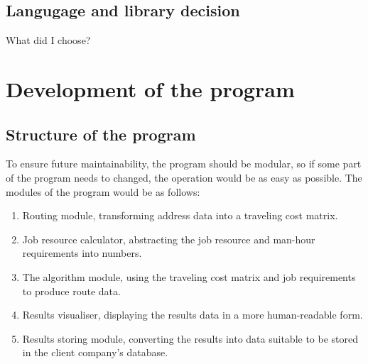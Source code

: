\subsection{Langugage and library decision}

What did I choose?

\section{Development of the program}

\subsection{Structure of the program}

To ensure future maintainability, the program should be modular, so if some part of the program needs to changed, the operation would be as easy as possible. The modules of the program would be as follows:

\begin{enumerate}  
\item Routing module, transforming address data into a traveling cost matrix.
\item Job resource calculator, abstracting the job resource and man-hour requirements into numbers.
\item The algorithm module, using the traveling cost matrix and job requirements to produce route data.
\item Results visualiser, displaying the results data in a more human-readable form.
\item Results storing module, converting the results into data suitable to be stored in the client company's database. 
\end{enumerate}

 